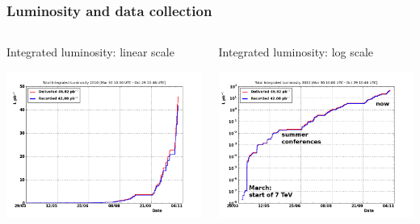 \documentclass[compress]{beamer}
\begin{document}
\begin{frame}
\frametitle{Luminosity and data collection}

\begin{columns}
\begin{center}
Integrated luminosity: linear scale

\includegraphics[width=\linewidth]{totallumivstime_3.png}
\end{center}

\begin{center}
Integrated luminosity: log scale

\includegraphics[width=\linewidth]{totallumivstime_log_3.png}
\end{center}
\end{columns}


\end{frame}
\end{document}

